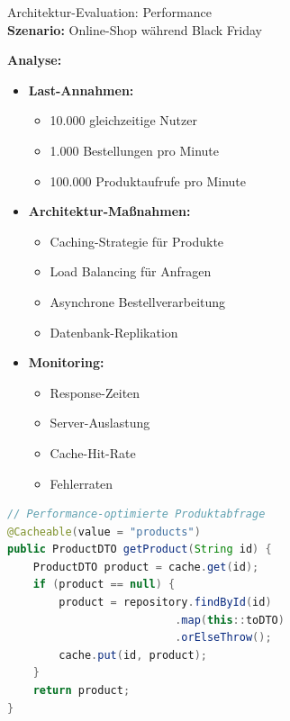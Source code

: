 \begin{example2}{Architektur-Evaluation: Performance}\\
\textbf{Szenario:} Online-Shop während Black Friday

\textbf{Analyse:}
\begin{itemize}
    \item \textbf{Last-Annahmen:}
    \begin{itemize}
        \item 10.000 gleichzeitige Nutzer
        \item 1.000 Bestellungen pro Minute
        \item 100.000 Produktaufrufe pro Minute
    \end{itemize}
    
    \item \textbf{Architektur-Maßnahmen:}
    \begin{itemize}
        \item Caching-Strategie für Produkte
        \item Load Balancing für Anfragen
        \item Asynchrone Bestellverarbeitung
        \item Datenbank-Replikation
    \end{itemize}
    
    \item \textbf{Monitoring:}
    \begin{itemize}
        \item Response-Zeiten
        \item Server-Auslastung
        \item Cache-Hit-Rate
        \item Fehlerraten
    \end{itemize}
\end{itemize}

\begin{lstlisting}[language=Java, style=basesmol]
// Performance-optimierte Produktabfrage
@Cacheable(value = "products")
public ProductDTO getProduct(String id) {
    ProductDTO product = cache.get(id);
    if (product == null) {
        product = repository.findById(id)
                          .map(this::toDTO)
                          .orElseThrow();
        cache.put(id, product);
    }
    return product;
}
\end{lstlisting}
\end{example2}





